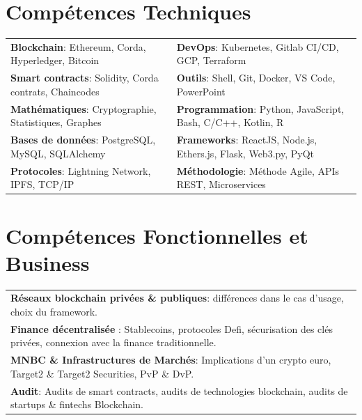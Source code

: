 \documentclass[10pt]{article}
\begin{document}
\vspace{2ex}

\section*{Compétences Techniques}

\vspace{2ex}

\begin{tabular}{ l l }
\textbf{Blockchain}: Ethereum, Corda, Hyperledger, Bitcoin & \textbf{DevOps}: Kubernetes, Gitlab CI/CD, GCP, Terraform \\[0.1cm]
\textbf{Smart contracts}: Solidity, Corda contrats, Chaincodes & \textbf{Outils}: Shell, Git, Docker, VS Code, PowerPoint \\[0.1cm]
\textbf{Mathématiques}: Cryptographie, Statistiques, Graphes & \textbf{Programmation}: Python, JavaScript, Bash, C/C++, Kotlin, R \\[0.1cm]
\textbf{Bases de données}: PostgreSQL, MySQL, SQLAlchemy & \textbf{Frameworks}: ReactJS, Node.js, Ethers.js, Flask, Web3.py, PyQt \\[0.1cm]
\textbf{Protocoles}: Lightning Network, IPFS, TCP/IP & \textbf{Méthodologie}: Méthode Agile, APIs REST, Microservices \\[0.1cm]
\end{tabular}

\vspace{2ex}

\section*{Compétences Fonctionnelles et Business}

\vspace{2ex}

\begin{tabular}{ l }
\textbf{Réseaux blockchain privées \& publiques}: différences dans le cas d'usage, choix du framework.\\[0.1cm]
\textbf{Finance décentralisée} : Stablecoins, protocoles Defi, sécurisation des clés privées, connexion avec la finance traditionnelle.\\[0.1cm]
\textbf{MNBC \& Infrastructures de Marchés}: Implications d'un crypto euro, Target2 \& Target2 Securities, PvP \& DvP.\\[0.1cm]
\textbf{Audit}: Audits de smart contracts, audits de technologies blockchain, audits de startups \& fintechs Blockchain.\\[0.1cm]
\end{tabular}
\end{document}
